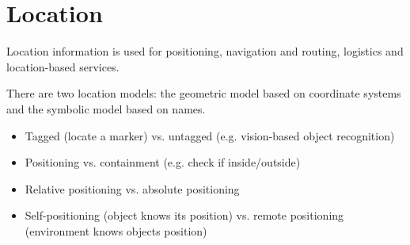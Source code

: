 \section{Location}
\begin{myremark} Location information is used for positioning, navigation and routing, logistics and location-based services.
\end{myremark}
\begin{mytitle} There are two location models: the geometric model based on coordinate systems and the symbolic model based on names.
\end{mytitle}

\begin{mytitle}\hfill
\begin{itemize}
    \item Tagged (locate a marker) vs. untagged (e.g. vision-based object recognition)
    \item Positioning vs. containment (e.g. check if inside/outside)
    \item Relative positioning vs. absolute positioning
    \item Self-positioning (object knows its position) vs. remote positioning (environment knows objects position)
\end{itemize}
\end{mytitle}

